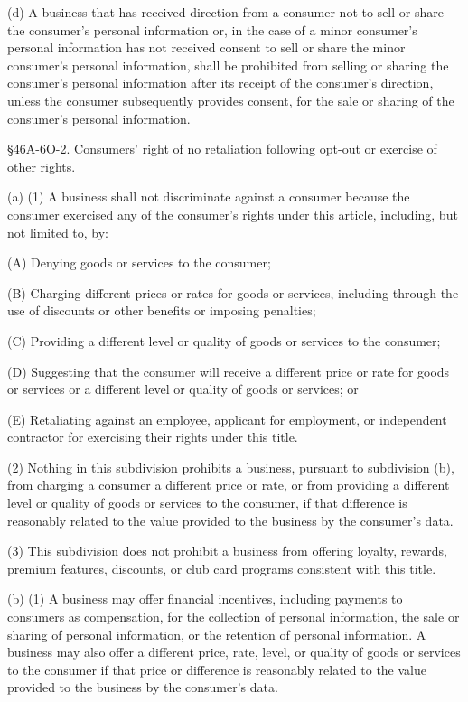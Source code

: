 (d) A business that has received direction from a consumer not to sell or share the consumer’s personal information or, in the case of a minor consumer’s personal information has not received consent to sell or share the minor consumer’s personal information, shall be prohibited from selling or sharing the consumer’s personal information after its receipt of the consumer’s direction, unless the consumer subsequently provides consent, for the sale or sharing of the consumer’s personal information.

§46A-6O-2. Consumers’ right of no retaliation following opt-out or exercise of other rights.


(a) (1) A business shall not discriminate against a consumer because the consumer exercised any of the consumer’s rights under this article, including, but not limited to, by:

(A) Denying goods or services to the consumer;

(B) Charging different prices or rates for goods or services, including through the use of discounts or other benefits or imposing penalties;

(C) Providing a different level or quality of goods or services to the consumer;

(D) Suggesting that the consumer will receive a different price or rate for goods or services or a different level or quality of goods or services; or

(E) Retaliating against an employee, applicant for employment, or independent contractor for exercising their rights under this title.

(2) Nothing in this subdivision prohibits a business, pursuant to subdivision (b), from charging a consumer a different price or rate, or from providing a different level or quality of goods or services to the consumer, if that difference is reasonably related to the value provided to the business by the consumer’s data.

(3) This subdivision does not prohibit a business from offering loyalty, rewards, premium features, discounts, or club card programs consistent with this title.

(b) (1) A business may offer financial incentives, including payments to consumers as compensation, for the collection of personal information, the sale or sharing of personal information, or the retention of personal information. A business may also offer a different price, rate, level, or quality of goods or services to the consumer if that price or difference is reasonably related to the value provided to the business by the consumer’s data.

